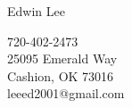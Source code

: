 \documentclass{res} %
\begin{document}

\begin{multicols}{2}
	{\Huge {Edwin Lee}}
	\vfill
	\columnbreak
	\begin{flushright}
		{720-402-2473}\\	
		{25095 Emerald Way}\\
		{Cashion, OK  73016}\\
		{leeed2001@gmail.com}
	\end{flushright}
\end{multicols}
\vspace{-0.45in}
\hrulefill
\vspace{-0.2in}
\end{document}

